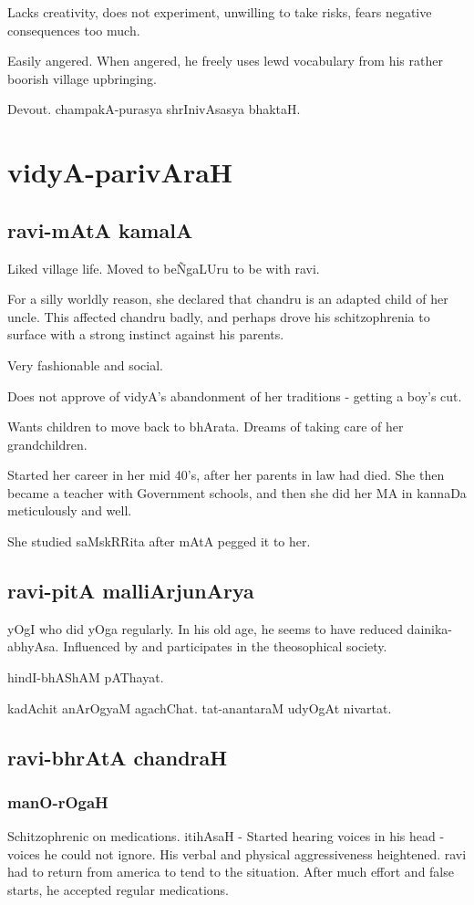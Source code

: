 \documentclass[oneside, article]{memoir}
\begin{document}
Lacks creativity, does not experiment, unwilling to take risks, fears negative consequences too much.

Easily angered. When angered, he freely uses lewd vocabulary from his rather boorish village upbringing.

Devout. champakA-purasya shrInivAsasya bhaktaH.

\part{vidyA-parivAraH}
\chapter{ravi-mAtA kamalA}
Liked village life. Moved to be\~NgaLUru to be with ravi.

For a silly worldly reason, she declared that chandru is an adapted child of her uncle. This affected chandru badly, and perhaps drove his schitzophrenia to surface with a strong instinct against his parents.

Very fashionable and social.

Does not approve of vidyA's abandonment of her traditions - getting a boy's cut.

Wants children to move back to bhArata. Dreams of taking care of her grandchildren.

Started her career in her mid 40's, after her parents in law had died. She then became a teacher with Government schools, and then she did her MA in kannaDa meticulously and well.

She studied saMskRRita after mAtA pegged it to her.

\chapter{ravi-pitA malliArjunArya}
yOgI who did yOga regularly. In his old age, he seems to have reduced dainika-abhyAsa. Influenced by and participates in the theosophical society.

hindI-bhAShAM pAThayat.

kadAchit anArOgyaM agachChat. tat-anantaraM udyOgAt nivartat.

\chapter{ravi-bhrAtA chandraH}
\section{manO-rOgaH}
Schitzophrenic on medications. itihAsaH - Started hearing voices in his head - voices he could not ignore. His verbal and physical aggressiveness heightened. ravi had to return from america to tend to the situation. After much effort and false starts, he accepted regular medications.
\end{document}
